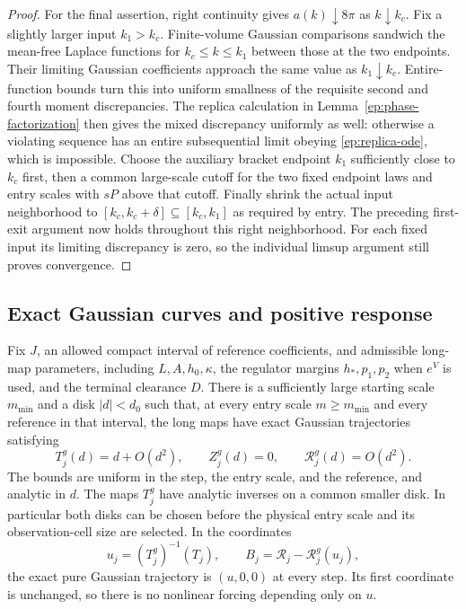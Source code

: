 \begin{proof}
For the final assertion, right continuity gives
$a(k)\downarrow8\pi$ as $k\downarrow k_c$.  Fix a slightly
larger input $k_1>k_c$.  Finite-volume Gaussian comparisons
sandwich the mean-free Laplace functions for
$k_c\le k\le k_1$ between those at the two endpoints.
Their limiting Gaussian coefficients approach the same value
as $k_1\downarrow k_c$.  Entire-function bounds turn this into
uniform smallness of the requisite second and fourth moment
discrepancies.  The replica calculation in
Lemma~\ref{ep:phase-factorization} then gives the mixed
discrepancy uniformly as well: otherwise a violating sequence
has an entire subsequential limit obeying
\eqref{ep:replica-ode}, which is impossible.
Choose the auxiliary bracket endpoint $k_1$ sufficiently close to
$k_c$ first, then a common large-scale cutoff for the two fixed
endpoint laws and entry scales with $sP$ above that cutoff.
Finally shrink the actual input neighborhood to
$[k_c,k_c+\delta]\subseteq[k_c,k_1]$ as required by entry.
The preceding first-exit argument now holds throughout this
right neighborhood.  For each fixed
input its limiting discrepancy is zero, so the individual
limsup argument still proves convergence.
\end{proof}

\subsection{Exact Gaussian curves and positive response}

\begin{lemma}
\label{ep:gaussian-curves}
Fix $J$, an allowed compact interval of reference coefficients, and
admissible long-map parameters, including $L,A,h_0,\kappa$, the
regulator margins $h_*,p_1,p_2$ when $e^V$ is used, and the terminal
clearance $D$.  There is a sufficiently large starting scale $m_{\min}$
and a disk $|d|<d_0$ such that, at every entry scale $m\ge m_{\min}$
and every reference in that interval, the long maps have exact Gaussian
trajectories satisfying
\[
 T_j^g(d)=d+O(d^2),\qquad Z_j^g(d)=0,\qquad
 \mathcal R_j^g(d)=O(d^2).
\]
The bounds are uniform in the step, the entry scale, and the reference,
and analytic in $d$.  The maps $T_j^g$ have analytic inverses on a
common smaller disk.  In particular both disks can be chosen before
the physical entry scale and its observation-cell size are selected.
In the coordinates
\begin{equation}\label{ep:normal-coordinates}
 u_j=(T_j^g)^{-1}(T_j),\qquad
 B_j=\mathcal R_j-\mathcal R_j^g(u_j),
\end{equation}
the exact pure Gaussian trajectory is $(u,0,0)$ at every step.
Its first coordinate is unchanged, so there is no nonlinear
forcing depending only on $u$.
\end{lemma}

